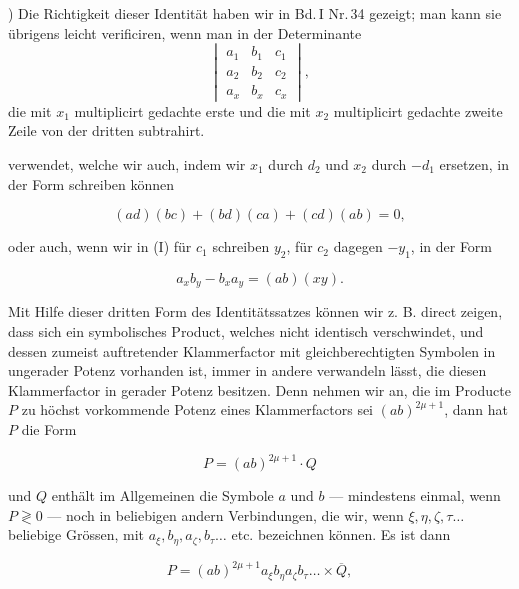 \documentclass[11pt]{article}
\providecommand{\weberpage}[1]{}
\providecommand{\weq}[2]{\begin{equation}\tag{#1}#2\end{equation}}
\begin{document}
\medskip
\noindent *) Die Richtigkeit dieser Identität haben wir in Bd.\,I
Nr.\,34 gezeigt; man kann sie übrigens leicht verificiren, wenn man in
der Determinante
\[
\begin{vmatrix} a_1 & b_1 & c_1 \\ a_2 & b_2 & c_2 \\ a_x & b_x & c_x \end{vmatrix} ,
\]
die mit $x_1$ multiplicirt gedachte erste und die mit $x_2$ multiplicirt gedachte zweite Zeile von der dritten subtrahirt.%


\weberpage{13}
verwendet, welche wir auch, indem wir $x_1$ durch $d_2$ und $x_2$ durch
$-d_1$ ersetzen, in der Form schreiben können

\weq{II}{(ad)(bc) + (bd)(ca) + (cd)(ab) = 0,}

oder auch, wenn wir in (I) %
für $c_1$ schreiben $y_2$, für $c_2$ dagegen $-y_1$,
in der Form

\weq{III}{a_xb_y - b_xa_y = (ab)(xy).}

Mit Hilfe dieser dritten Form des Identitätssatzes können wir z. B.
direct zeigen, dass sich ein symbolisches Product, welches nicht identisch
verschwindet, und dessen zumeist auftretender Klammerfactor mit
gleichberechtigten Symbolen in ungerader Potenz vorhanden ist, immer
in andere verwandeln lässt, die diesen Klammerfactor in gerader Potenz
besitzen. Denn nehmen wir an, die im Producte $P$ zu höchst vorkommende
Potenz eines Klammerfactors sei $(ab)^{2\mu+1}$, dann hat $P$ die Form

\[ P = (ab)^{2\mu+1}\cdot Q \]

und $Q$ enthält im Allgemeinen die Symbole $a$ und $b$ --- mindestens
einmal, wenn $P\gtrless 0$ --- noch in beliebigen andern Verbindungen,
die wir, wenn $\xi, \eta, \zeta, \tau \ldots$ beliebige Grössen, mit
$a_\xi, b_\eta, a_\zeta, b_\tau \ldots$ etc. bezeichnen können. Es ist dann

\[ P = (ab)^{2\mu+1} a_\xi b_\eta a_\zeta b_\tau \ldots \times \overline{Q}, \]
\end{document}
